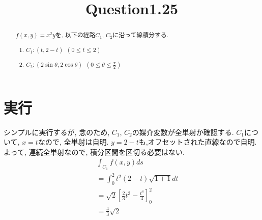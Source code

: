 \documentclass{jsarticle} \usepackage[dvipdfmx]{graphicx} \usepackage[dvipdfmx]{hyperref}
\title{Question1.25}
\begin{document}
\maketitle

\begin{abstract}
  $f(x, y) = x^2 y$を, 以下の経路$C_1$, $C_2$に沿って線積分する. 
  \begin{enumerate}
    \item $C_1:(t, 2-t)~~(0\leq t \leq 2)$
    \item $C_2:(2\sin\theta, 2\cos\theta)~~(0\leq \theta \leq \frac{\pi}{2})$
  \end{enumerate}

\end{abstract}

\section*{実行}
シンプルに実行するが, 念のため, $C_1$, $C_2$の媒介変数が全単射か確認する. 
$C_1$について, $x = t$なので, 全単射は自明. $y = 2 - t$も,オフセットされた直線なので自明.
よって, 連続全単射なので, 積分区間を区切る必要はない.
\begin{eqnarray}
  && \int_{C_1}f(x, y)ds \nonumber \\
  && = \int_0^2 t^2(2-t)\sqrt{1 + 1}dt \nonumber \\
  && = \sqrt{2} \left[\frac{2}{3}t^3 - \frac{t^4}{4} \right]^2_0 \nonumber \\
  && = \frac{4}{3}\sqrt{2}
\end{eqnarray}
\end{document}
